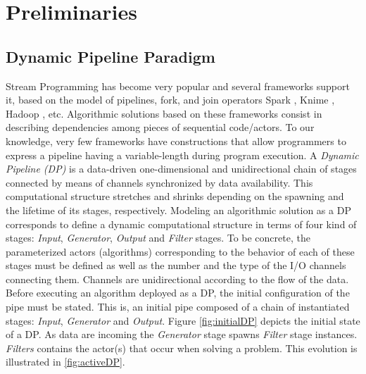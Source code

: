 \documentclass[preprint]{elsarticle}
\begin{document}
\section{Preliminaries}\label{section:prelim}
\subsection{Dynamic Pipeline Paradigm}\label{sub:sec:dp:par}
%
Stream Programming has become very popular and several frameworks support it, based on the model of pipelines, fork, and join operators Spark \cite{apachespark}, Knime \cite{knime}, Hadoop \cite{hadoop}, etc. Algorithmic solutions based on these frameworks consist in describing dependencies among pieces of sequential code/actors. To our knowledge, very few frameworks have constructions that allow programmers to express a pipeline having a variable-length during program execution. A \textit{Dynamic Pipeline  (DP)}  \cite{dpdef} is a data-driven one-dimensional and unidirectional chain of stages connected by means of channels synchronized by data availability. This computational structure stretches and shrinks depending on the spawning and the lifetime of its stages, respectively. Modeling an algorithmic solution as a DP corresponds to define a dynamic computational structure  in terms of four kind of stages:  \textit{Input},  \textit{Generator},  \textit{Output} and \textit{Filter} stages.  To be concrete, the parameterized actors (algorithms)  corresponding to the behavior of each of these stages must be defined as well as the number and the type of the I/O channels connecting them. Channels are unidirectional according to the flow of the data. Before executing an algorithm deployed as a  DP, the initial configuration of the pipe must be stated. This is, an initial pipe composed of a chain of instantiated stages: \textit{Input},  \textit{Generator} and \textit{Output}. Figure \ref{fig:initialDP} depicts the initial state of a DP.  As data are incoming  the \textit{Generator} stage spawns \textit{Filter} stage instances. \textit{Filters} contains the actor(s) that occur when solving a problem. This evolution is illustrated in  \autoref{fig:activeDP}.
%

%
\end{document}
